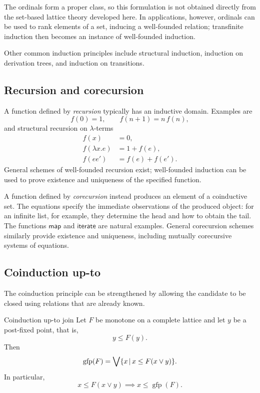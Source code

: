 \documentclass[a4paper]{article}
\newcommand{\gfp}{\operatorname{gfp}}
\begin{document}
The ordinals form a proper class, so this formulation is not obtained directly from the set-based lattice theory developed here.
In applications, however, ordinals can be used to rank elements of a set, inducing a well-founded relation; transfinite induction then becomes an instance of well-founded induction.

Other common induction principles include structural induction, induction on derivation trees, and induction on transitions.

\subsection{Recursion and corecursion}

A function defined by \emph{recursion} typically has an inductive domain.
Examples are
\[
    f(0)=1,
    \qquad
    f(n+1)=n\,f(n),
\]
and structural recursion on \(\lambda\)-terms
\begin{align*}
    f(x)&=0,\\
    f(\lambda x.e)&=1+f(e),\\
    f(ee')&=f(e)+f(e').
\end{align*}
General schemes of well-founded recursion exist; well-founded induction can be used to prove existence and uniqueness of the specified function.

A function defined by \emph{corecursion} instead produces an element of a coinductive set.
The equations specify the immediate observations of the produced object: for an infinite list, for example, they determine the head and how to obtain the tail.
The functions \(\mathsf{map}\) and \(\mathsf{iterate}\) are natural examples.
General corecursion schemes similarly provide existence and uniqueness, including mutually corecursive systems of equations.

\subsection{Coinduction up-to}

The coinduction principle can be strengthened by allowing the candidate to be closed using relations that are already known.

\begin{snippettheorem}{Coinduction up-to join}
    Let \(F\) be monotone on a complete lattice and let \(y\) be a post-fixed point, that is,
    \[
        y\leq F(y).
    \]
    Then
    \[
        \gfp(F)
        =
        \bigvee\{x\suchthat x\leq F(x\vee y)\}.
    \]
    In particular,
    \[
        x\leq F(x\vee y)
        \implies
        x\leq\gfp(F).
    \]
\end{snippettheorem}
\end{document}
